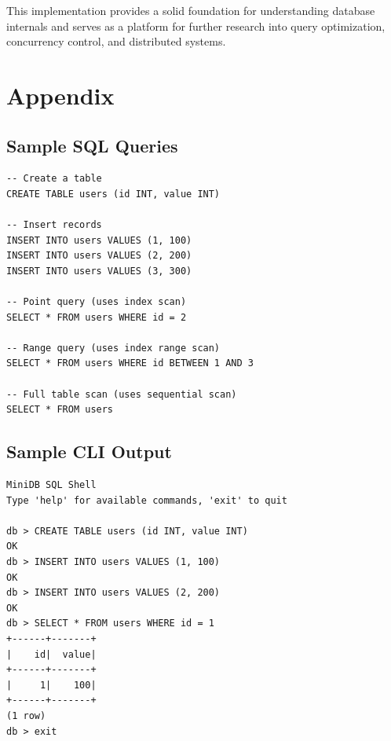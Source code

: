 \documentclass{article}
\begin{document}
This implementation provides a solid foundation for understanding database internals and serves as a platform for further research into query optimization, concurrency control, and distributed systems.

\section*{Appendix}

\subsection{Sample SQL Queries}

\begin{verbatim}
-- Create a table
CREATE TABLE users (id INT, value INT)

-- Insert records
INSERT INTO users VALUES (1, 100)
INSERT INTO users VALUES (2, 200)
INSERT INTO users VALUES (3, 300)

-- Point query (uses index scan)
SELECT * FROM users WHERE id = 2

-- Range query (uses index range scan)
SELECT * FROM users WHERE id BETWEEN 1 AND 3

-- Full table scan (uses sequential scan)
SELECT * FROM users
\end{verbatim}

\subsection{Sample CLI Output}

\begin{verbatim}
MiniDB SQL Shell
Type 'help' for available commands, 'exit' to quit

db > CREATE TABLE users (id INT, value INT)
OK
db > INSERT INTO users VALUES (1, 100)
OK
db > INSERT INTO users VALUES (2, 200)
OK
db > SELECT * FROM users WHERE id = 1
+------+-------+
|    id|  value|
+------+-------+
|     1|    100|
+------+-------+
(1 row)
db > exit
\end{verbatim}
\end{document}
